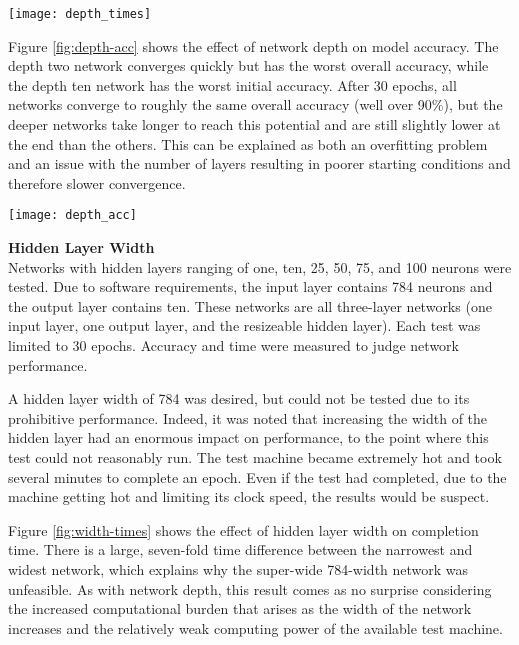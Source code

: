 \documentclass[letter,11pt,titlepage]{article}
\begin{document}
\begin{center}
    \centering
    \texttt{[image: depth\_times]}
    \label{fig:depth-times}
\end{center}

Figure \ref{fig:depth-acc} shows the effect of network depth on model accuracy. The depth two network converges quickly but has the worst overall accuracy, while the depth ten network has the worst initial accuracy. After 30 epochs, all networks converge to roughly the same overall accuracy (well over 90\%), but the deeper networks take longer to reach this potential and are still slightly lower at the end than the others. This can be explained as both an overfitting problem and an issue with the number of layers resulting in poorer starting conditions and therefore slower convergence.

\begin{center}
    \centering
    \texttt{[image: depth\_acc]}
    \label{fig:depth-acc}
\end{center}

\textbf{\large{Hidden Layer Width}} \\
Networks with hidden layers ranging of one, ten, 25, 50, 75, and 100 neurons were tested. Due to software requirements, the input layer contains 784 neurons and the output layer contains ten. These networks are all three-layer networks (one input layer, one output layer, and the resizeable hidden layer). Each test was limited to 30 epochs. Accuracy and time were measured to judge network performance.

A hidden layer width of 784 was desired, but could not be tested due to its prohibitive performance. Indeed, it was noted that increasing the width of the hidden layer had an enormous impact on performance, to the point where this test could not reasonably run. The test machine became extremely hot and took several minutes to complete an epoch. Even if the test had completed, due to the machine getting hot and limiting its clock speed, the results would be suspect. 

Figure \ref{fig:width-times} shows the effect of hidden layer width on completion time. There is a large, seven-fold time difference between the narrowest and widest network, which explains why the super-wide 784-width network was unfeasible. As with network depth, this result comes as no surprise considering the increased computational burden that arises as the width of the network increases and the relatively weak computing power of the available test machine.
\end{document}
